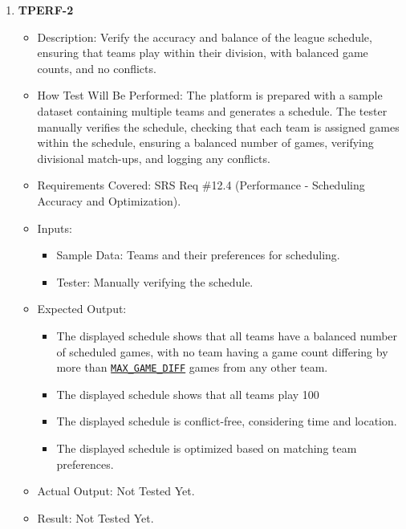 \documentclass[12pt, titlepage]{article}
\begin{document}
\begin{enumerate}
\item \textbf{TPERF-2}  
    \begin{itemize}
        \item Description: Verify the accuracy and balance of the league schedule, ensuring that teams play within their division, with balanced game counts, and no conflicts.
        \item How Test Will Be Performed: The platform is prepared with a sample dataset containing multiple teams and generates a schedule. The tester manually verifies the schedule, checking that each team is assigned games within the schedule, ensuring a balanced number of games, verifying divisional match-ups, and logging any conflicts.
        \item Requirements Covered: SRS Req \#12.4 (Performance - Scheduling Accuracy and Optimization).
        \item Inputs:  
            \begin{itemize}
                \item Sample Data: Teams and their preferences for scheduling.
                \item Tester: Manually verifying the schedule.
            \end{itemize}
        \item Expected Output:  
            \begin{itemize}
                \item The displayed schedule shows that all teams have a balanced number of scheduled games, with no team having a game count differing by more than \hyperref[MAX_GAME_DIFF]{\texttt{MAX\_GAME\_DIFF}} games from any other team.
                \item The displayed schedule shows that all teams play 100%
                \item The displayed schedule is conflict-free, considering time and location.
                \item The displayed schedule is optimized based on matching team preferences.
            \end{itemize}
        \item Actual Output: Not Tested Yet.
        \item Result: Not Tested Yet.
    \end{itemize}


\end{enumerate}
\end{document}
